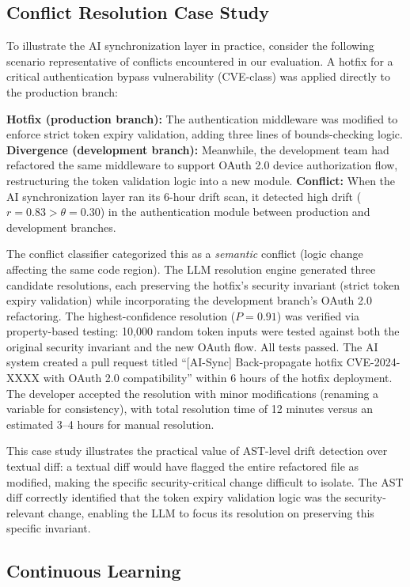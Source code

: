 \documentclass[journal]{IEEEtran}
\begin{document}
\subsection{Conflict Resolution Case Study}

To illustrate the AI synchronization layer in practice, consider the following scenario representative of conflicts encountered in our evaluation. A hotfix for a critical authentication bypass vulnerability (CVE-class) was applied directly to the production branch:

\textbf{Hotfix (production branch):} The authentication middleware was modified to enforce strict token expiry validation, adding three lines of bounds-checking logic. \textbf{Divergence (development branch):} Meanwhile, the development team had refactored the same middleware to support OAuth 2.0 device authorization flow, restructuring the token validation logic into a new module. \textbf{Conflict:} When the AI synchronization layer ran its 6-hour drift scan, it detected high drift ($r = 0.83 > \theta = 0.30$) in the authentication module between production and development branches.

The conflict classifier categorized this as a \textit{semantic} conflict (logic change affecting the same code region). The LLM resolution engine generated three candidate resolutions, each preserving the hotfix's security invariant (strict token expiry validation) while incorporating the development branch's OAuth 2.0 refactoring. The highest-confidence resolution ($P = 0.91$) was verified via property-based testing: 10,000 random token inputs were tested against both the original security invariant and the new OAuth flow. All tests passed. The AI system created a pull request titled ``[AI-Sync] Back-propagate hotfix CVE-2024-XXXX with OAuth 2.0 compatibility'' within 6 hours of the hotfix deployment. The developer accepted the resolution with minor modifications (renaming a variable for consistency), with total resolution time of 12 minutes versus an estimated 3--4 hours for manual resolution.

This case study illustrates the practical value of AST-level drift detection over textual diff: a textual diff would have flagged the entire refactored file as modified, making the specific security-critical change difficult to isolate. The AST diff correctly identified that the token expiry validation logic was the security-relevant change, enabling the LLM to focus its resolution on preserving this specific invariant.

\subsection{Continuous Learning}
\end{document}
